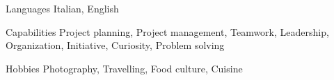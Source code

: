 \begin{minipage}[]{0.4\textwidth}
  \vspace{2.0mm}

  \begin{cvskills}
    \hspace{4.0mm}
    \cvskill
      {Languages}
      {Italian, English}
    
    \cvskill
      {Capabilities}
      {Project planning, Project management, Teamwork, Leadership, Organization, Initiative, Curiosity, Problem solving}

    \cvskill
      {Hobbies}
      {Photography, Travelling, Food culture, Cuisine}
  \end{cvskills}
\end{minipage}%
\begin{minipage}[]{0.6\textwidth}
  \hfill
\end{minipage}
\vspace{-2.0mm}
